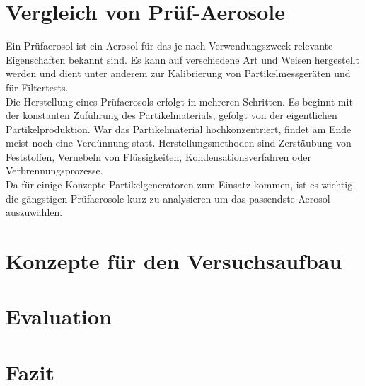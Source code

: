\chapter{Vergleich von Pr\"{u}f-Aerosole}\label{ch:aerosol}
Ein Pr\"{u}faerosol ist ein Aerosol f\"{u}r das je nach Verwendungszweck relevante Eigenschaften bekannt sind. Es kann auf verschiedene Art und Weisen hergestellt werden und dient unter anderem zur Kalibrierung von Partikelmessger\"{a}ten und f\"{u}r Filtertests.\\
Die Herstellung eines Pr\"{u}faerosols erfolgt in mehreren Schritten. Es beginnt mit der konstanten Zuf\"{u}hrung des Partikelmaterials, gefolgt von der eigentlichen Partikelproduktion. War das Partikelmaterial hochkonzentriert, findet am Ende meist noch eine Verd\"{u}nnung statt. Herstellungsmethoden sind Zerst\"{a}ubung von Feststoffen, Vernebeln von Fl\"{u}ssigkeiten, Kondensationsverfahren oder Verbrennungsprozesse.\\
Da f\"{u}r einige Konzepte Partikelgeneratoren zum Einsatz kommen, ist es wichtig die g\"{a}ngstigen Pr\"{u}faerosole kurz zu analysieren um das passendste Aerosol auszuw\"{a}hlen.







\chapter{Konzepte f\"{u}r den Versuchsaufbau}\label{ch:concepts}








\chapter{Evaluation}\label{ch:evaluation}




\chapter{Fazit}\label{ch:conclusion}



